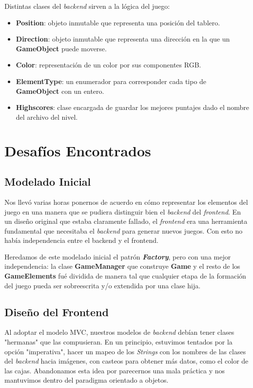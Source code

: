 \documentclass[a4paper,12pt,titlepage]{article}
\begin{document}
Distintas clases del \emph{backend} sirven a la lógica del juego:

\begin{itemize}
    \item \textbf{Position}: objeto inmutable que representa una posición del tablero.
    \item \textbf{Direction}: objeto inmutable que representa una dirección en la que un \textbf{GameObject} puede moverse.
    \item \textbf{Color}: representación de un color por sus componentes RGB.
    \item \textbf{ElementType}: un enumerador para corresponder cada tipo de \textbf{GameObject} con un entero.
	\item \textbf{Highscores}: clase encargada de guardar los mejores puntajes dado el nombre del archivo del nivel.
\end{itemize}

\section{Desafíos Encontrados}

\subsection{Modelado Inicial}

Nos llevó varias horas ponernos de acuerdo en cómo representar los elementos del juego en una manera que se pudiera distinguir bien el \emph{backend} del \emph{frontend}. En un diseño original que estaba claramente fallado, el \emph{frontend} era una herramienta fundamental que necesitaba el \emph{backend} para generar nuevos juegos. Con esto no había independencia entre el backend y el frontend.

Heredamos de este modelado inicial el patrón \emph{\textbf{Factory}}, pero con una mejor independencia: la clase \textbf{GameManager} que construye \textbf{Game} y el resto de los \textbf{GameElements} fué dividida de manera tal que cualquier etapa de la formación del juego pueda ser sobreescrita y/o extendida por una clase hija.

\subsection{Diseño del Frontend}

Al adoptar el modelo MVC, nuestros modelos de \emph{backend} debían tener clases "hermanas" que las compusieran. En un principio, estuvimos tentados por la opción "imperativa", hacer un mapeo de los \emph{Strings} con los nombres de las clases del \emph{backend} hacia imágenes, con casteos para obtener más datos, como el color de las cajas. Abandonamos esta idea por parecernos una mala práctica y nos mantuvimos dentro del paradigma orientado a objetos.
\end{document}

